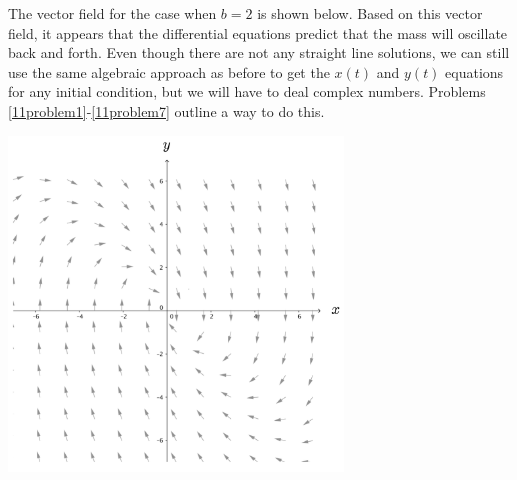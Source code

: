 The vector field for the case when $b = 2$ is shown below. Based on this vector field, it appears that the differential equations predict that the mass will oscillate back and forth. Even though there are not any straight line solutions, we can still use the same algebraic approach as before to get the $x(t)$ and $y(t)$ equations for any initial condition, but we will have to deal complex numbers. Problems \ref{11problem1}-\ref{11problem7} outline a way to do this.
\begin{center}
\includegraphics[width=3.5in]{11/11figure.png}
\end{center} 

